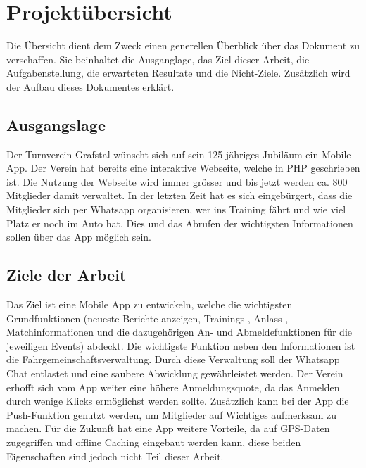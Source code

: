 %
%

\chapter{Projektübersicht}\label{chap.projektuebersicht}
Die Übersicht dient dem Zweck einen generellen Überblick über das Dokument zu verschaffen. Sie beinhaltet die Ausganglage, das Ziel dieser Arbeit, die Aufgabenstellung, die erwarteten Resultate und die Nicht-Ziele. Zusätzlich wird der Aufbau dieses Dokumentes erklärt.

\section{Ausgangslage}\label{ausganglage}
Der Turnverein Grafstal wünscht sich auf sein 125-jähriges Jubiläum ein Mobile App. Der Verein hat bereits eine interaktive Webseite, welche in PHP geschrieben ist. Die Nutzung der Webseite wird immer grösser und bis jetzt werden ca. 800 Mitglieder damit verwaltet. In der letzten Zeit hat es sich eingebürgert, dass die Mitglieder sich per Whatsapp organisieren, wer ins Training fährt und wie viel Platz er noch im Auto hat. Dies und das Abrufen der wichtigsten Informationen sollen über das App möglich sein.

\section{Ziele der Arbeit}\label{ziele}
Das Ziel ist eine Mobile App zu entwickeln, welche die wichtigsten Grundfunktionen (neueste Berichte anzeigen, Trainings-, Anlass-, Matchinformationen und die dazugehörigen An- und Abmeldefunktionen für die jeweiligen Events) abdeckt. Die wichtigste Funktion neben den Informationen ist die Fahrgemeinschaftsverwaltung. Durch diese Verwaltung soll der Whatsapp Chat entlastet und eine saubere Abwicklung gewährleistet werden. Der Verein erhofft sich vom App weiter eine höhere Anmeldungsquote, da das Anmelden durch wenige Klicks ermöglichst werden sollte. Zusätzlich kann bei der App die Push-Funktion genutzt werden, um Mitglieder auf Wichtiges aufmerksam zu machen. Für die Zukunft hat eine App weitere Vorteile, da auf GPS-Daten zugegriffen  und offline Caching eingebaut  werden kann, diese beiden Eigenschaften sind jedoch nicht Teil dieser Arbeit.

